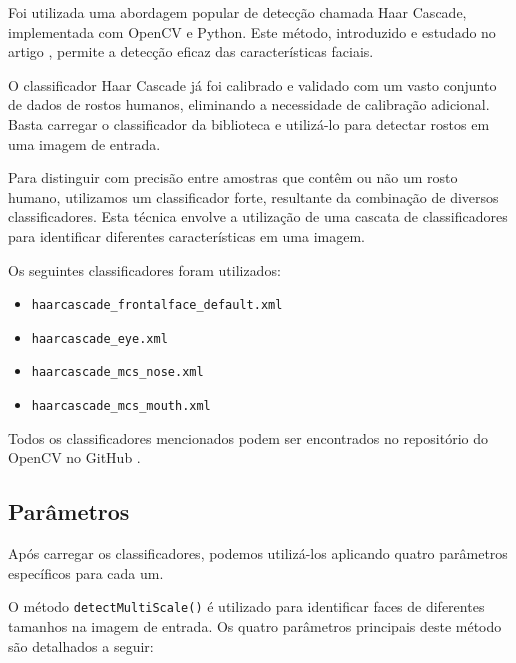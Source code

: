 Foi utilizada uma abordagem popular de detecção chamada Haar Cascade, implementada com OpenCV e Python. Este método, introduzido e estudado no artigo \cite{BoostedCascade}, permite a detecção eficaz das características faciais.

O classificador Haar Cascade já foi calibrado e validado com um vasto conjunto de dados de rostos humanos, eliminando a necessidade de calibração adicional. Basta carregar o classificador da biblioteca e utilizá-lo para detectar rostos em uma imagem de entrada.

Para distinguir com precisão entre amostras que contêm ou não um rosto humano, utilizamos um classificador forte, resultante da combinação de diversos classificadores. Esta técnica envolve a utilização de uma cascata de classificadores para identificar diferentes características em uma imagem.

Os seguintes classificadores foram utilizados:

\begin{itemize}
    \item \texttt{haarcascade\_frontalface\_default.xml}
    \item \texttt{haarcascade\_eye.xml}
    \item \texttt{haarcascade\_mcs\_nose.xml}
    \item \texttt{haarcascade\_mcs\_mouth.xml}
\end{itemize}

Todos os classificadores mencionados podem ser encontrados no repositório do OpenCV no GitHub \cite{HaarAplicacao}.

\subsection{Parâmetros}

Após carregar os classificadores, podemos utilizá-los aplicando quatro parâmetros específicos para cada um.

O método \texttt{detectMultiScale()} é utilizado para identificar faces de diferentes tamanhos na imagem de entrada. Os quatro parâmetros principais deste método são detalhados a seguir:

